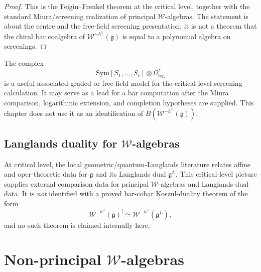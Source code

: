 \begin{proof}
This is the Feigin--Frenkel theorem at the critical level, together
with the standard Miura/screening realization of principal
$\mathcal W$-algebras.  The statement is about the centre and the
free-field screening presentation; it is not a theorem that the
chiral bar coalgebra of $\mathcal W^{-h^\vee}(\mathfrak g)$ is equal
to a polynomial algebra on screenings.
\end{proof}

\begin{remark}
\label{rem:w-critical-bar-viewpoint}
The complex
\[
\mathrm{Sym}[S_1,\ldots,S_r]\otimes\Omega^*_{\log}
\]
is a useful associated-graded or free-field model for the
critical-level screening calculation.  It may serve as a lead for a
bar computation after the Miura comparison, logarithmic extension,
and completion hypotheses are supplied.  This chapter does not use it
as an identification of $\bar B(\mathcal W^{-h^\vee}(\mathfrak g))$.
\end{remark}

\subsection{Langlands duality for $\mathcal{W}$-algebras}

\begin{remark}
\label{rem:frenkel-gaitsgory-langlands-viewpoint}
At critical level, the local geometric/quantum-Langlands literature
relates affine and oper-theoretic data for $\mathfrak g$ and its
Langlands dual $\mathfrak g^L$. This critical-level picture supplies
external comparison data for principal $\mathcal W$-algebras and
Langlands-dual data. It is
\emph{not} identified with a proved bar-cobar Koszul-duality theorem of
the form
\[
\mathcal{W}^{-h^{\vee}}(\mathfrak{g})^! \simeq
\mathcal{W}^{-h^{\vee}}(\mathfrak{g}^L),
\]
and no such theorem is claimed internally here.
\end{remark}


\section{Non-principal $\mathcal{W}$-algebras}

